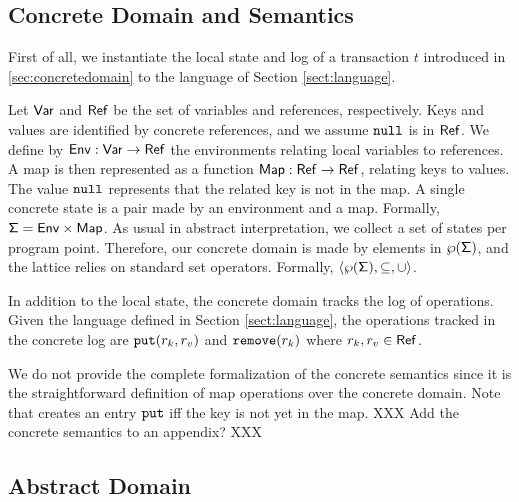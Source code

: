 \subsection{Concrete Domain and Semantics}
\label{sec:concretemap}
First of all, we instantiate the local state and log of a transaction $t$ introduced in \ref{sec:concretedomain} to the language of Section \ref{sect:language}.

Let $\mathsf{Var}$ and $\mathsf{Ref}$ be the set of variables and references, respectively. Keys and values are identified by concrete references, and we assume $\mathtt{null}$ is in $\mathsf{Ref}$. We define by $\mathsf{Env} : \mathsf{Var} \to \mathsf{Ref}$ the environments relating local variables to references. A map is then represented as a function $\mathsf{Map} : \mathsf{Ref} \to \mathsf{Ref}$, relating keys to values. The value $\mathtt{null}$ represents that the related key is not in the map. A single concrete state is a pair made by an environment and a map. Formally, $\mathsf{\Sigma} = \mathsf{Env} \times \mathsf{Map}$. As usual in abstract interpretation, we collect a set of states per program point. Therefore, our concrete domain is made by elements in $\wp(\mathsf{\Sigma})$, and the lattice relies on standard set operators. Formally, $\langle \wp(\mathsf{\Sigma}), \subseteq, \cup \rangle$.

In addition to the local state, the concrete domain tracks the log of operations. Given the language defined in Section \ref{sect:language}, the operations tracked in the concrete log are $\mathtt{put}(r_k, r_v)$ and $\mathtt{remove}(r_k)$ where $r_k, r_v \in \mathsf{Ref}$.

We do not provide the complete formalization of the concrete semantics since it is the straightforward definition of map operations over the concrete domain. Note that  creates an entry $\mathtt{put}$ iff the key is not yet in the map. XXX Add the concrete semantics to an appendix? XXX

\subsection{Abstract Domain}
\label{sect:abstractate}

